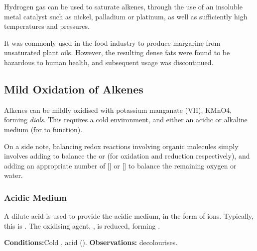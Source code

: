 		Hydrogen gas can be used to saturate alkenes, through the use of an insoluble metal catalyst such as nickel, palladium or platinum,
		as well as sufficiently high temperatures and pressures.

		It was commonly used in the food industry to produce margarine from unsaturated plant oils. However, the resulting dense fats were
		found to be hazardous to human health, and subsequent usage was discontinued.






	\pagebreak
	\subsection{Mild Oxidation of Alkenes}

		Alkenes can be mildly oxidised with potassium manganate (VII), KMnO4, forming \textit{diols}. This requires a cold environment,
		and either an acidic or alkaline medium (for  to function).

		On a side note, balancing redox reactions involving organic molecules simply involves adding  to balance the
		 or  (for oxidation and reduction respectively), and adding an appropriate number of [] or []
		to balance the remaining oxygen or water.


		\subsubsection{Acidic Medium}

		A dilute acid is used to provide the acidic medium, in the form of  ions. Typically, this is . The oxidising
		agent, , is reduced, forming .

		\vspace{1.5em}
		\vbox{\textbf{Conditions:}\tabto{35mm}Cold , acid ().}	%
		\vbox{\textbf{Observations:}  decolourises.}


